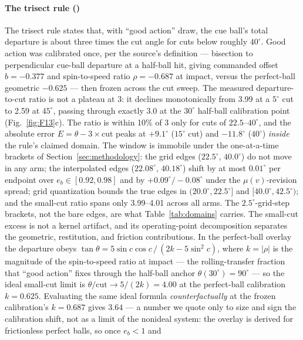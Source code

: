 \paragraph{The trisect rule ()}
The trisect rule \citep{alciatore_faq} states that, with ``good action''
draw, the cue ball's total departure is about three times the cut angle
for cuts below roughly $40^\circ$. Good action was calibrated once, per
the source's definition --- bisection to perpendicular cue-ball departure
at a half-ball hit, giving commanded offset $b = -0.377$ and
spin-to-speed ratio $\rho = -0.687$ at impact, versus the perfect-ball
geometric $-0.625$ --- then frozen across the cut sweep. The measured
departure-to-cut ratio is not a plateau at 3: it declines monotonically
from 3.99 at a $5^\circ$ cut to 2.59 at $45^\circ$, passing through
exactly 3.0 at the $30^\circ$ half-ball calibration point
(Fig.~\ref{fig:F13}c). The ratio is within 10\% of 3 only for cuts of
$22.5$--$40^\circ$, and the absolute error $E = \theta - 3\times\mathrm{cut}$
peaks at $+9.1^\circ$ ($15^\circ$ cut) and $-11.8^\circ$ ($40^\circ$)
\emph{inside} the rule's claimed domain. The window is immobile under the
one-at-a-time brackets of Section~\ref{sec:methodology}: the grid edges
($22.5^\circ$, $40.0^\circ$) do not move in any arm; the interpolated
edges ($22.08^\circ$, $40.18^\circ$) shift by at most $0.01^\circ$ per
endpoint over $e_b \in [0.92, 0.98]$ and by $+0.09^\circ/-0.08^\circ$
under the $\mu(v)$-revision spread; grid quantization bounds the true
edges in $(20.0^\circ, 22.5^\circ]$ and $[40.0^\circ, 42.5^\circ)$; and
the small-cut ratio spans only 3.99--4.01 across all arms. The
$2.5^\circ$-grid-step brackets, not the bare edges, are what
Table~\ref{tab:domains} carries. The small-cut excess is not a kernel
artifact, and its operating-point decomposition separates the
geometric, restitution, and friction contributions. In the perfect-ball
overlay the departure obeys $\tan\theta = 5\sin c\cos c\,/\,(2k -
5\sin^2 c)$, where $k = |\rho|$ is the magnitude of the spin-to-speed
ratio at impact --- the rolling-transfer fraction that ``good action''
fixes through the half-ball anchor $\theta(30^\circ) = 90^\circ$ ---
so the ideal small-cut limit is $\theta/\mathrm{cut} \to 5/(2k) = 4.00$
at the perfect-ball calibration $k = 0.625$. Evaluating the same ideal
formula \emph{counterfactually} at the frozen calibration's $k = 0.687$
gives $3.64$ --- a number we quote only to size and sign the
calibration shift, not as a limit of the nonideal system: the overlay
is derived for frictionless perfect balls, so once $e_b < 1$ and
